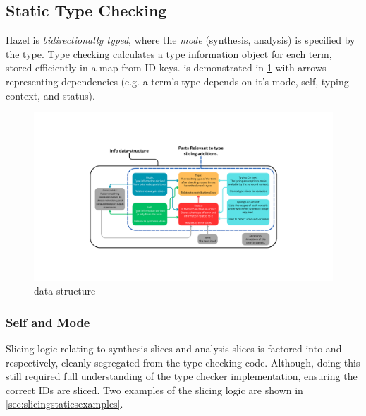 \subsection{Static Type Checking}\label{sec:TypeChecking}
Hazel is \textit{bidirectionally typed}, where the \textit{mode} (synthesis, analysis) is specified by the  type. Type checking calculates a type information object  for each term, stored efficiently in a map from ID keys.  is demonstrated in \cref{fig:Info} with arrows representing dependencies (e.g. a term's type depends on it's mode, self, typing context, and status).
\begin{figure}[h]
\includegraphics[width=1\textwidth, trim={8cm 5cm 8cm 5cm}, clip]{Media/Figures/info}
\caption{ data-structure}
\label{fig:Info}
\end{figure}

\subsubsection{Self and Mode}
Slicing logic relating to synthesis slices and analysis slices is factored into  and  respectively, cleanly segregated from the type checking code. Although, doing this still required full understanding of the type checker implementation, ensuring the correct IDs are sliced. Two examples of the slicing logic are shown in \cref{sec:slicingstaticsexamples}.

